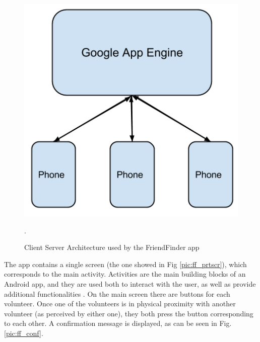 \begin{figure}[h]
	\begin{center}
		\includegraphics[scale=0.5]{figures/SC_Arch.png}
	\end{center}
	
	\caption{Client Server Architecture used by the FriendFinder app}.
	\label{pic:clientserver}

\end{figure} 

The app contains a single screen (the one showed in Fig \ref{pic:ff_prtscr}), which corresponds to the main activity. Activities are the main building blocks of an Android app, and they are used both to interact with the user, as well as provide additional functionalities \cite{activity}. On the main screen there are buttons for each volunteer. Once one of the volunteers is in physical proximity with another volunteer (as perceived by either one), they both press the button corresponding to each other. A confirmation message is displayed, as can be seen in Fig. \ref{pic:ff_conf}.

